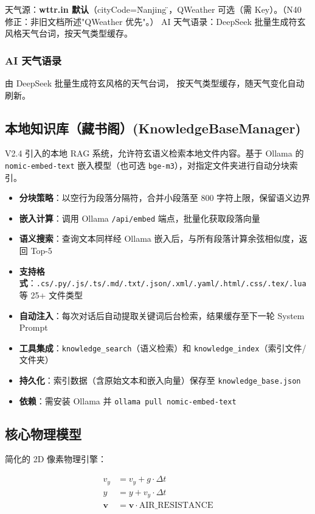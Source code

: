 \documentclass[12pt,a4paper]{ctexart}
\begin{document}
天气源：\textbf{wttr.in 默认}（cityCode=\"Nanjing\"），QWeather 可选（需 Key）。（N40 修正：非旧文档所述"QWeather 优先"。）
AI 天气语录：DeepSeek 批量生成符玄风格天气台词，按天气类型缓存。

\subsubsection{AI 天气语录}

由 DeepSeek 批量生成符玄风格的天气台词，
按天气类型缓存，随天气变化自动刷新。

\subsection{本地知识库（藏书阁）(KnowledgeBaseManager)}

V2.4 引入的本地 RAG 系统，允许符玄语义检索本地文件内容。基于 Ollama 的
\texttt{nomic-embed-text} 嵌入模型（也可选 \texttt{bge-m3}），对指定文件夹进行自动分块索引。

\begin{itemize}
    \item \textbf{分块策略}：以空行为段落分隔符，合并小段落至 800 字符上限，保留语义边界
    \item \textbf{嵌入计算}：调用 Ollama \texttt{/api/embed} 端点，批量化获取段落向量
    \item \textbf{语义搜索}：查询文本同样经 Ollama 嵌入后，与所有段落计算余弦相似度，返回 Top-5
    \item \textbf{支持格式}：\texttt{.cs/.py/.js/.ts/.md/.txt/.json/.xml/.yaml/.html/.css/.tex/.lua}
          等 25+ 文件类型
    \item \textbf{自动注入}：每次对话后自动提取关键词后台检索，结果缓存至下一轮 System Prompt
    \item \textbf{工具集成}：\texttt{knowledge\_search}（语义检索）和 \texttt{knowledge\_index}（索引文件/文件夹）
    \item \textbf{持久化}：索引数据（含原始文本和嵌入向量）保存至 \texttt{knowledge\_base.json}
    \item \textbf{依赖}：需安装 Ollama 并 \texttt{ollama pull nomic-embed-text}
\end{itemize}

\subsection{核心物理模型}

简化的 2D 像素物理引擎：

\[
\begin{aligned}
v_y &= v_y + g \cdot \Delta t \\
y &= y + v_y \cdot \Delta t \\
\mathbf{v} &= \mathbf{v} \cdot \text{AIR\_RESISTANCE}
\end{aligned}
\]
\end{document}
